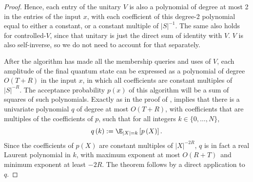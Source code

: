 \begin{proof}
Hence, each entry of the unitary $V$ is also a polynomial of degree at most 2 in the entries of the input $x$,
with each coefficient of this degree-2 polynomial equal
to either a constant, or a constant multiple of $|S|^{-1}$. The same also holds for controlled-$V$, since that unitary is just the direct sum of identity with $V$. $V$ is also self-inverse, so we do not need to account for that separately.

After the algorithm has made all the membership queries and uses of $V$, each amplitude of the final quantum state can be expressed as a polynomial of degree $O(T + R)$ in the input $x$, in which all coefficients are constant multiples of $|S|^{-R}$. The acceptance probability $p(x)$ of this algorithm will be a sum of squares of such polynomials. 
Exactly
as in the proof of ,
 implies that there is a univariate polynomial
$q$ of degree at most $O(T+R)$, with coefficients that are multiples
of the coefficients of $p$, such that for all integers $k \in \{0, \dots, N\}$, 
\begin{equation}
q\left(  k\right)  :=\E_{\left\vert X\right\vert =k}\left[
p\left(  X\right)  \right]  .
\end{equation}
Since the coefficients of $p(X)$ are constant multiples of $|X|^{-2R}$, 
$q$ is in fact a real Laurent polynomial in $k$, with maximum exponent at most $O(R+T)$\ and minimum exponent at
least $-2R$.
The theorem follows by a direct 
application  to $q$.
\end{proof}
%
